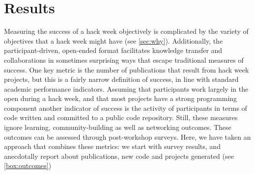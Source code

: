 \section*{Results}

Measuring the success of a hack week objectively is complicated by the variety of objectives that a hack week might have (see \ref{sec:why}).
Additionally, the participant-driven, open-ended format facilitates knowledge transfer and collaborations in sometimes surprising ways that escape traditional measures of success.
One key metric is the number of publications that result from hack week projects, but this is a fairly narrow definition of success, in line with standard academic performance indicators.
Assuming that participants work largely in the open during a hack week, and that most projects have a strong programming component another indicator of success is the activity of participants in terms of code written and committed to a public code repository.
Still, these measures ignore learning, community-building as well as networking outcomes.
These outcomes can be assessed through post-workshop surveys.
Here, we have taken an approach that combines these metrics: we start with survey results, and anecdotally report about publications, new code and projects generated (see \ref{box:outcomes})


